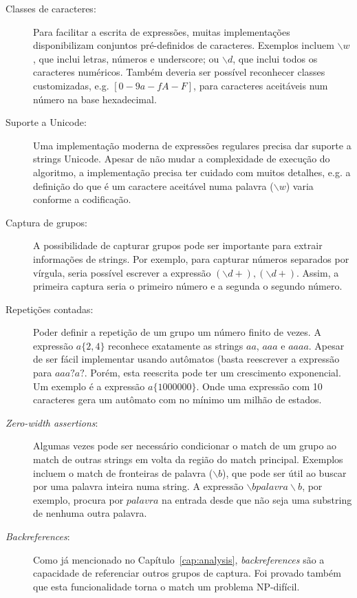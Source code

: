 \documentclass[a4paper,12pt,oneside,onecolumn]{uerj}
\begin{document}
\begin{description}
	\item[Classes de caracteres:] Para facilitar a escrita de expressões, muitas implementações disponibilizam conjuntos pré-definidos de caracteres. Exemplos incluem $\backslash w$, que inclui letras, números e underscore; ou $\backslash d$, que inclui todos os caracteres numéricos. Também deveria ser possível reconhecer classes customizadas, e.g. $[0-9a-fA-F]$, para caracteres aceitáveis num número na base hexadecimal.

	\item[Suporte a Unicode:] Uma implementação moderna de expressões regulares precisa dar suporte a strings Unicode. Apesar de não mudar a complexidade de execução do algoritmo, a implementação precisa ter cuidado com muitos detalhes, e.g. a definição do que é um caractere aceitável numa palavra ($\backslash w$) varia conforme a codificação.

	\item[Captura de grupos:] A possibilidade de capturar grupos pode ser importante para extrair informações de strings. Por exemplo, para capturar números separados por vírgula, seria possível escrever a expressão $(\backslash d+),(\backslash d+)$. Assim, a primeira captura seria o primeiro número e a segunda o segundo número.

	\item[Repetições contadas:] Poder definir a repetição de um grupo um número finito de vezes. A expressão $a\{2,4\}$ reconhece exatamente as strings $aa$, $aaa$ e $aaaa$. Apesar de ser fácil implementar usando autômatos (basta reescrever a expressão para $aaa?a?$. Porém, esta reescrita pode ter um crescimento exponencial. Um exemplo é a expressão $a\{1000000\}$. Onde uma expressão com 10 caracteres gera um autômato com no mínimo um milhão de estados.
	
	\item[\emph{Zero-width assertions}:] Algumas vezes pode ser necessário condicionar o match de um grupo ao match de outras strings em volta da região do match principal. Exemplos incluem o match de fronteiras de palavra ($\backslash b$), que pode ser útil ao buscar por uma palavra inteira numa string. A expressão $\backslash bpalavra\backslash b$, por exemplo, procura por $palavra$ na entrada desde que não seja uma substring de nenhuma outra palavra.
	
	\item[\emph{Backreferences}:] Como já mencionado no Capítulo~\ref{cap:analysis}, \emph{backreferences} são a capacidade de referenciar outros grupos de captura. Foi provado também que esta funcionalidade torna o match um problema NP-difícil.
		
\end{description}
\end{document}
